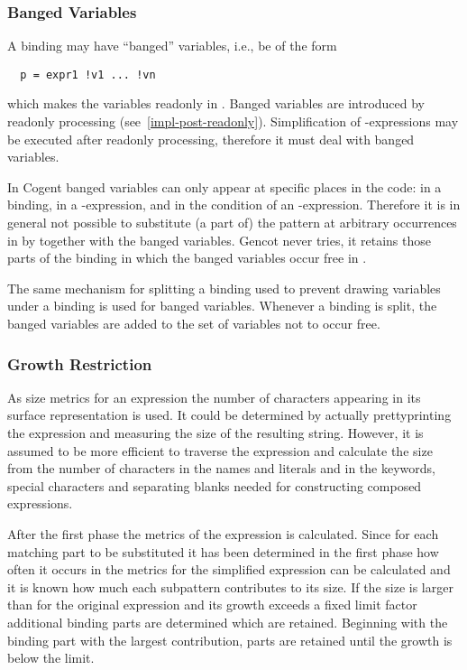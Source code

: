 \subsubsection{Banged Variables}

A binding may have ``banged'' variables, i.e., be of the form
\begin{verbatim}
  p = expr1 !v1 ... !vn
\end{verbatim}
which makes the variables  readonly in . Banged variables are introduced by readonly processing 
(see~\ref{impl-post-readonly}). Simplification of -expressions may be executed after readonly processing, therefore it
must deal with banged variables.

In Cogent banged variables can only appear at specific places in the code: in a  binding, in a -expression, 
and in the condition of an -expression. Therefore it is in general not possible to substitute (a part of) the pattern 
at arbitrary occurrences in  by  together with the banged variables. Gencot never tries, it retains those
parts of the binding in which the banged variables occur free in .

The same mechanism for splitting a binding used to prevent drawing variables under a binding is used for banged variables. Whenever
a binding is split, the banged variables are added to the set of variables not to occur free.

\subsubsection{Growth Restriction}

As size metrics for an expression the number of characters appearing in its surface representation is used. It could be determined
by actually prettyprinting the expression and measuring the size of the resulting string. However, it is assumed to be more
efficient to traverse the expression and calculate the size from the number of characters in the names and literals and in
the keywords, special characters and separating blanks needed for constructing composed expressions.

After the first phase the metrics of the  expression is calculated. Since for each matching part to be substituted it 
has been determined in the first phase how often it occurs in  the metrics for the simplified expression can be 
calculated and it is known how much each subpattern contributes to its size. If the size is larger than for the original 
expression and its growth exceeds a fixed limit factor additional binding parts are determined which are retained. 
Beginning with the binding part with the largest contribution, parts are retained until the growth is below the limit.


